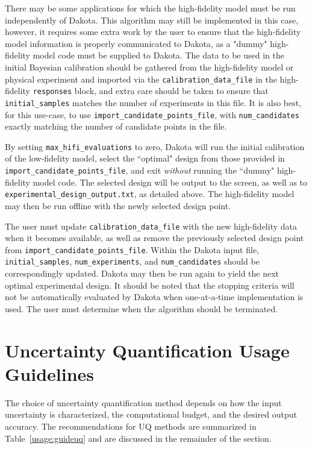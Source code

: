 There may be some applications for which the high-fidelity model must be run
independently of Dakota. This algorithm may still be implemented in this case,
however, it requires some extra work by the user to ensure that the 
high-fidelity model information is properly communicated to Dakota, as a 
"dummy" high-fidelity model code must be supplied to Dakota. The data to be 
used in the initial Bayesian calibration should be gathered from the 
high-fidelity model or physical experiment and imported via the 
\texttt{calibration\_data\_file} in the high-fidelity \texttt{responses} block, 
and extra care should be taken to ensure that \texttt{initial\_samples} matches 
the number of experiments in this file. It is also best, for this use-case, to 
use \texttt{import\_candidate\_points\_file}, with \texttt{num\_candidates} 
exactly matching the number of candidate points in the file.

By setting \texttt{max\_hifi\_evaluations} to zero, Dakota will run the initial
calibration of the low-fidelity model, select the ``optimal" design from
those provided in \texttt{import\_candidate\_points\_file}, and exit 
\textit{without} running the ``dummy" high-fidelity model code. The selected
design will be output to the screen, as well as to 
\texttt{experimental\_design\_output.txt}, as detailed above. The high-fidelity
model may then be run offline with the newly selected design point.

The user must update \texttt{calibration\_data\_file} with the new 
high-fidelity data when it becomes available, as well as remove the previously
selected design point from \texttt{import\_candidate\_points\_file}. Within the Dakota input file, \texttt{initial\_samples}, \texttt{num\_experiments}, and 
\texttt{num\_candidates} should be correspondingly updated. Dakota may then be
run again to yield the next optimal experimental design. It should be noted 
that the stopping criteria will not be automatically evaluated by Dakota when 
one-at-a-time implementation is used. The user must determine when the 
algorithm should be terminated.

\section{Uncertainty Quantification Usage Guidelines} \label{usage:uq}

The choice of uncertainty quantification method depends on how the
input uncertainty is characterized, the computational budget, and the
desired output accuracy.  The recommendations for UQ methods are
summarized in Table~\ref{usage:guideuq} and are discussed in the
remainder of the section.


